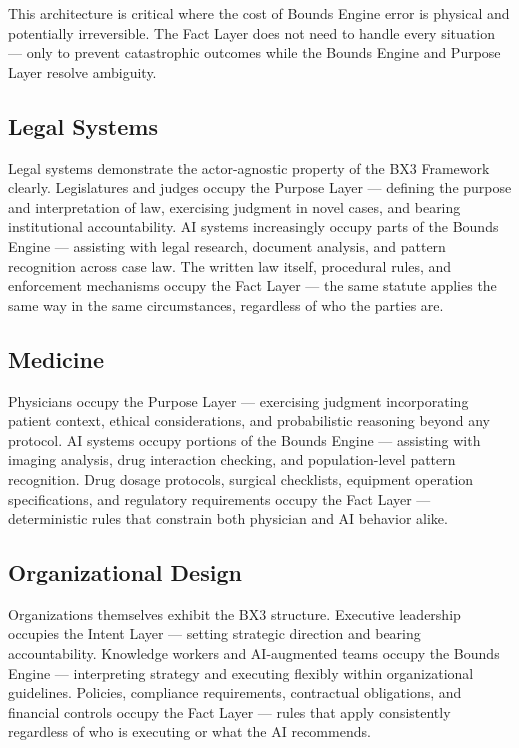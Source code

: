 \documentclass[12pt]{article}
\begin{document}
This architecture is critical where the cost of Bounds Engine error is physical and potentially irreversible. The Fact Layer does not need to handle every situation --- only to prevent catastrophic outcomes while the Bounds Engine and Purpose Layer resolve ambiguity.

\subsection{Legal Systems}

Legal systems demonstrate the actor-agnostic property of the BX3 Framework clearly. Legislatures and judges occupy the Purpose Layer --- defining the purpose and interpretation of law, exercising judgment in novel cases, and bearing institutional accountability. AI systems increasingly occupy parts of the Bounds Engine --- assisting with legal research, document analysis, and pattern recognition across case law. The written law itself, procedural rules, and enforcement mechanisms occupy the Fact Layer --- the same statute applies the same way in the same circumstances, regardless of who the parties are.

\subsection{Medicine}

Physicians occupy the Purpose Layer --- exercising judgment incorporating patient context, ethical considerations, and probabilistic reasoning beyond any protocol. AI systems occupy portions of the Bounds Engine --- assisting with imaging analysis, drug interaction checking, and population-level pattern recognition. Drug dosage protocols, surgical checklists, equipment operation specifications, and regulatory requirements occupy the Fact Layer --- deterministic rules that constrain both physician and AI behavior alike.

\subsection{Organizational Design}

Organizations themselves exhibit the BX3 structure. Executive leadership occupies the Intent Layer --- setting strategic direction and bearing accountability. Knowledge workers and AI-augmented teams occupy the Bounds Engine --- interpreting strategy and executing flexibly within organizational guidelines. Policies, compliance requirements, contractual obligations, and financial controls occupy the Fact Layer --- rules that apply consistently regardless of who is executing or what the AI recommends.
\end{document}
